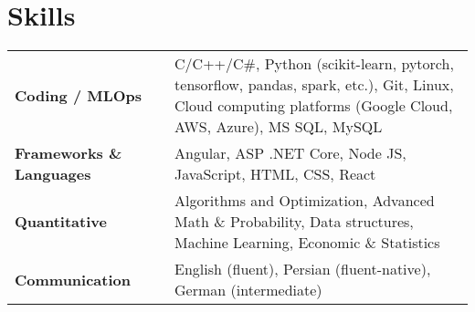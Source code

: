 \documentclass[10pt,letterpaper,roman]{moderncv} %
\begin{document}
	\section{Skills}
	\renewcommand{\arraystretch}{1.1}
	\begin{tabular}{p{9em} p{1em} p{35em}}
	\textbf{Coding / MLOps} &  &   C/C++/C\#, Python (scikit-learn, pytorch, tensorflow, pandas, spark, etc.), Git, Linux, Cloud computing platforms (Google Cloud, AWS, Azure), MS SQL, MySQL \\
	\textbf{Frameworks \& Languages} & & Angular, ASP .NET Core, Node JS, JavaScript, HTML, CSS, React \\
		\textbf{Quantitative} & &  Algorithms and Optimization, Advanced Math \& Probability, Data structures, Machine Learning, Economic \& Statistics\\
		\textbf{Communication} & &  English (fluent), Persian (fluent-native), German (intermediate)\\
	\end{tabular}
	
\end{document}
